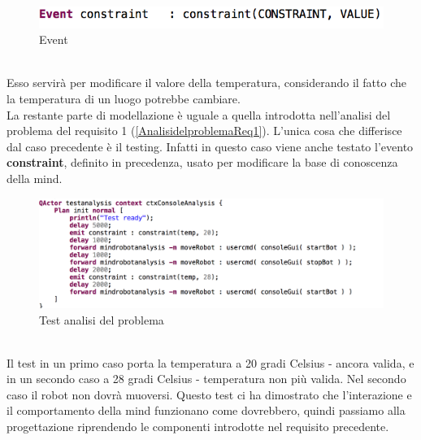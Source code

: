 \documentclass{llncs}
\begin{document}
\begin{figure}
    \centering
    \includegraphics[width=1\textwidth]{Immagini/Requisito2/EventconstraintReq2.png}
    \caption{Event}
    \label{fig:EventReq2}
\end{figure}
\vspace*{1ex}
\\
Esso servir\`a per modificare il valore della temperatura, considerando il fatto che la temperatura di un luogo potrebbe cambiare.\\
La restante parte di modellazione \`e uguale a quella introdotta nell'analisi del problema del requisito 1 (\hyperref[AnalisidelproblemaReq1]{\ref{AnalisidelproblemaReq1}}). L'unica cosa che differisce dal caso precedente \`e il testing. Infatti in questo caso viene anche testato l'evento \textbf{constraint}, definito in precedenza, usato per modificare la base di conoscenza della mind. \\
\begin{figure}
    \centering
    \includegraphics[width=1\textwidth]{Immagini/Requisito2/PATestReq2.png}
    \caption{Test analisi del problema}
    \label{fig:my_label}
\end{figure}
\vspace*{1ex}
\\
Il test in un primo caso porta la temperatura a 20 gradi Celsius - ancora valida, e in un secondo caso a 28 gradi Celsius - temperatura non pi\`u valida. Nel secondo caso il robot non dovr\`a muoversi.
Questo test ci ha dimostrato che l'interazione e il comportamento della mind funzionano come dovrebbero, quindi passiamo alla progettazione riprendendo le componenti introdotte nel requisito precedente.
\pagebreak 

\end{document}
